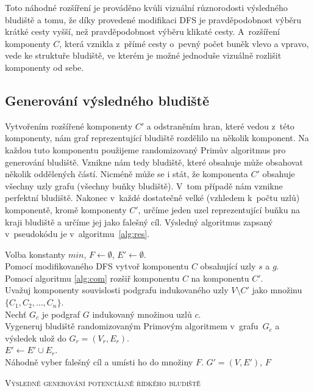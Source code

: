 \documentclass[a4paper,12pt]{article}
\begin{document}
Toto náhodné rozšíření 
je prováděno kvůli vizuální různorodosti výsledného bludiště a tomu, že díky provedené modifikaci DFS je pravděpodobnost 
výběru krátké cesty vyšší, než pravděpodobnost výběru klikaté cesty. A~rozšíření komponenty $C$, která vznikla
z~přímé cesty o~pevný počet buněk vlevo a vpravo, vede ke struktuře bludiště, ve kterém je možné jednoduše vizuálně rozlišit
komponenty od sebe.

\subsection{Generování výsledného bludiště}
Vytvořením rozšířené komponenty $C'$ a odstraněním hran, které vedou z~této komponenty, nám graf reprezentující bludiště
rozdělilo na několik komponent. Na každou tuto komponentu použijeme randomizovaný Primův algoritmus pro generování
bludiště. Vznikne nám tedy bludiště, které obsahuje může obsahovat několik oddělených částí. Nicméně může se i stát, 
že komponenta $C'$ obsahuje všechny uzly grafu (všechny buňky bludiště). V~tom případě nám vznikne perfektní bludiště.
Nakonec v~každé dostatečně velké (vzhledem k~počtu uzlů) komponentě, kromě komponenty $C'$, určíme jeden uzel reprezentující buňku na kraji bludiště
a určíme jej jako falešný cíl. Výsledný algoritmus zapsaný v~pseudokódu je v~algoritmu~\ref{alg:res}.

\medskip

 \begin{algorithm}[H]
 \SetNlSty{}{}{:}
 \SetNlSkip{-1.0em}
 \SetInd{0.7em}{0.7em}
 \BlankLine
 \Indentp{1.7em}
   Volba konstanty $min$, $F\gets\emptyset$, $E'\gets\emptyset$. \\
   Pomocí modifikovaného DFS vytvoř komponentu $C$ obsahující uzly $s$ a $g$.\\
   Pomocí algoritmu \ref{alg:com} rozšiř komponentu $C$ na komponentu $C'$.\\
   Uvažuj komponenty souvislosti podgrafu indukovaného uzly $V\setminus C'$ jako množinu $\{C_1, C_2, \dots, C_n\}$.\\
    {
      Nechť $G_c$ je podgraf $G$ indukovaný množinou uzlů $c$. \\
      Vygeneruj bludiště randomizovaným Primovým algoritmem v~grafu~$G_c$ a výsledek ulož do $G_r = (V_r, E_r)$. \\
      $E' \gets E' \cup E_r$. \\
       {
	Náhodně vyber falešný cíl a umísti ho do množiny $F$.
      }
   }
   \Return $G' = (V, E')$, $F$
 \caption{\textsc{Výsledné generování potenciálně řídkého bludiště}}
 \label{alg:res}
\end{algorithm}
\end{document}
